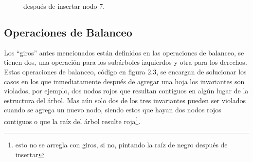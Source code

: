\begin{figure}
\centering
\captionsetup{justification=centering}
\label{arbolRB}
\caption{{\Arn} después de insertar nodo 7.}
\end{figure}
\subsection{Operaciones de Balanceo}
Los ``giros'' antes mencionados están definidos en las operaciones de balanceo, se tienen dos, una
operaci\'on para los subárboles izquierdos y otra para los derechos. Estas operaciones de
balanceo, c\'odigo en figura 2.3, se encargan de solucionar los casos en los que inmediatamente
después de agregar una hoja los invariantes son violados, por ejemplo, dos nodos rojos que
resultan contiguos en algún lugar de la estructura del \'arbol. Mas a\'un solo dos de los tres
invariantes pueden ser violados cuando se agrega un nuevo nodo, siendo estos que hayan dos nodos
rojos contiguos o que la raíz del árbol resulte roja\footnote{esto no se arregla con giros, si no,
pintando la raíz de negro después de insertar}.

